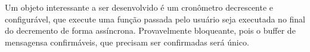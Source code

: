Um objeto interessante a ser desenvolvido \'e um cron\^ometro decrescente e configur\'avel, que execute uma fun\c{c}\~ao passada pelo usu\'ario seja executada no final do decremento de forma ass\'incrona. Provavelmente bloqueante, pois o buffer de mensagensa confirm\'aveis, que precisam ser confirmadas ser\'a \'unico.
